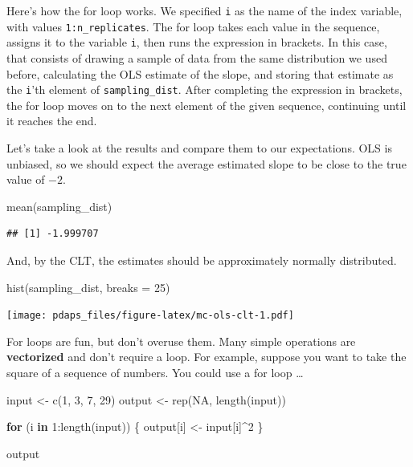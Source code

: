 \documentclass[
  12pt,
  oneside,openany]{book}
\newenvironment{Shaded}{\begin{snugshade}}{\end{snugshade}}
\newcommand{\AttributeTok}[1]{\textcolor[rgb]{0.77,0.63,0.00}{#1}}
\newcommand{\ConstantTok}[1]{\textcolor[rgb]{0.00,0.00,0.00}{#1}}
\newcommand{\ControlFlowTok}[1]{\textcolor[rgb]{0.13,0.29,0.53}{\textbf{#1}}}
\newcommand{\DecValTok}[1]{\textcolor[rgb]{0.00,0.00,0.81}{#1}}
\newcommand{\FunctionTok}[1]{\textcolor[rgb]{0.00,0.00,0.00}{#1}}
\newcommand{\NormalTok}[1]{#1}
\newcommand{\OtherTok}[1]{\textcolor[rgb]{0.56,0.35,0.01}{#1}}
\newcommand{\SpecialCharTok}[1]{\textcolor[rgb]{0.00,0.00,0.00}{#1}}
\begin{document}
Here's how the for loop works.
We specified \texttt{i} as the name of the index variable, with values \texttt{1:n\_replicates}.
The for loop takes each value in the sequence, assigns it to the variable \texttt{i}, then runs the expression in brackets.
In this case, that consists of drawing a sample of data from the same distribution we used before, calculating the OLS estimate of the slope, and storing that estimate as the \texttt{i}'th element of \texttt{sampling\_dist}.
After completing the expression in brackets, the for loop moves on to the next element of the given sequence, continuing until it reaches the end.

Let's take a look at the results and compare them to our expectations.
OLS is unbiased, so we should expect the average estimated slope to be close to the true value of \(-2\).

\begin{Shaded}
\begin{Highlighting}[]
\FunctionTok{mean}\NormalTok{(sampling\_dist)}
\end{Highlighting}
\end{Shaded}

\begin{verbatim}
## [1] -1.999707
\end{verbatim}

And, by the CLT, the estimates should be approximately normally distributed.

\begin{Shaded}
\begin{Highlighting}[]
\FunctionTok{hist}\NormalTok{(sampling\_dist, }\AttributeTok{breaks =} \DecValTok{25}\NormalTok{)}
\end{Highlighting}
\end{Shaded}

\texttt{[image: pdaps\_files/figure-latex/mc-ols-clt-1.pdf]}

For loops are fun, but don't overuse them. Many simple operations are \textbf{vectorized} and don't require a loop. For example, suppose you want to take the square of a sequence of numbers. You could use a for loop \ldots{}

\begin{Shaded}
\begin{Highlighting}[]
\NormalTok{input }\OtherTok{\textless{}{-}} \FunctionTok{c}\NormalTok{(}\DecValTok{1}\NormalTok{, }\DecValTok{3}\NormalTok{, }\DecValTok{7}\NormalTok{, }\DecValTok{29}\NormalTok{)}
\NormalTok{output }\OtherTok{\textless{}{-}} \FunctionTok{rep}\NormalTok{(}\ConstantTok{NA}\NormalTok{, }\FunctionTok{length}\NormalTok{(input))}

\ControlFlowTok{for}\NormalTok{ (i }\ControlFlowTok{in} \DecValTok{1}\SpecialCharTok{:}\FunctionTok{length}\NormalTok{(input)) \{}
\NormalTok{  output[i] }\OtherTok{\textless{}{-}}\NormalTok{ input[i]}\SpecialCharTok{\^{}}\DecValTok{2}
\NormalTok{\}}

\NormalTok{output}
\end{Highlighting}
\end{Shaded}
\end{document}
